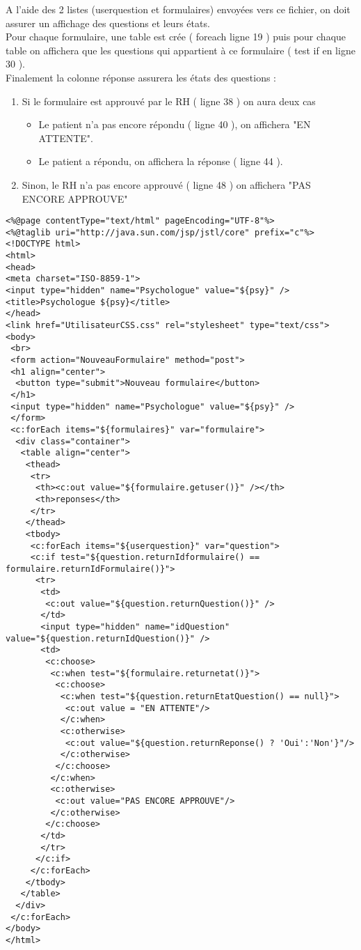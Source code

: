 \documentclass[12]{article}
\begin{document}
A l'aide des 2 listes (userquestion et formulaires) envoyées vers ce fichier, on doit assurer un affichage des questions et leurs états.\\

Pour chaque formulaire, une table est crée ( foreach ligne 19 )  puis pour chaque table on affichera que les questions qui appartient à ce formulaire ( test if en ligne 30 ).\\

Finalement la colonne réponse assurera les états des questions :
\begin{enumerate}
\item Si le formulaire est approuvé par le RH ( ligne 38 ) on aura deux cas
\begin{itemize}
\item Le patient n'a pas encore répondu ( ligne 40 ), on affichera "EN ATTENTE".
\item Le patient a répondu, on affichera la réponse ( ligne 44 ).
\end{itemize} 
\item Sinon, le RH n'a pas encore approuvé ( ligne 48 ) on affichera "PAS ENCORE APPROUVE"
\end{enumerate}


\newpage




\begin{scriptsize}
\lstset{language=XML}
\begin{lstlisting}
<%@page contentType="text/html" pageEncoding="UTF-8"%>
<%@taglib uri="http://java.sun.com/jsp/jstl/core" prefix="c"%>
<!DOCTYPE html>
<html>
<head>
<meta charset="ISO-8859-1">
<input type="hidden" name="Psychologue" value="${psy}" />
<title>Psychologue ${psy}</title>
</head>
<link href="UtilisateurCSS.css" rel="stylesheet" type="text/css">
<body>
 <br>
 <form action="NouveauFormulaire" method="post">
 <h1 align="center">
  <button type="submit">Nouveau formulaire</button>
 </h1>
 <input type="hidden" name="Psychologue" value="${psy}" />
 </form>
 <c:forEach items="${formulaires}" var="formulaire">
  <div class="container">
   <table align="center">
    <thead>
     <tr>
      <th><c:out value="${formulaire.getuser()}" /></th>
      <th>reponses</th>
     </tr>
    </thead>
    <tbody>
     <c:forEach items="${userquestion}" var="question">
     <c:if test="${question.returnIdformulaire() == formulaire.returnIdFormulaire()}">
      <tr>
       <td>
        <c:out value="${question.returnQuestion()}" />
       </td>
       <input type="hidden" name="idQuestion" value="${question.returnIdQuestion()}" />
       <td>
        <c:choose>	
         <c:when test="${formulaire.returnetat()}">
          <c:choose>
		   <c:when test="${question.returnEtatQuestion() == null}">
			<c:out value = "EN ATTENTE"/>
		   </c:when>
		   <c:otherwise>
			<c:out value="${question.returnReponse() ? 'Oui':'Non'}"/>
		   </c:otherwise>
		  </c:choose>
		 </c:when>
   		 <c:otherwise>
		  <c:out value="PAS ENCORE APPROUVE"/>
		 </c:otherwise>
		</c:choose>
	   </td>
	   </tr>
	  </c:if>
	 </c:forEach>
	</tbody>
   </table>
  </div>
 </c:forEach>
</body>
</html>
\end{lstlisting}
\end{scriptsize}
\end{document}
